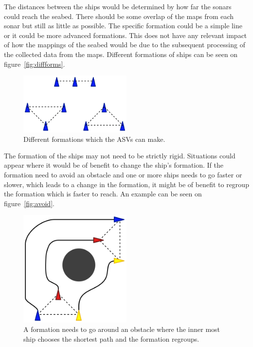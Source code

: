 The distances between the ships would be determined by how far the sonars could reach the seabed. There should be some overlap of the maps from each sonar but still as little as possible. The specific formation could be a simple line or it could be more advanced formations. This does not have any relevant impact of how the mappings of the seabed would be due to the subsequent processing of the collected data from the maps. Different formations of ships can be seen on figure~\vref{fig:diffforms}.
\begin{figure}[htbp]
	\centering
	\includegraphics[width=0.5\textwidth]{fig/diffforms}
	\caption{Different formations which the \ac{ASV}s can make.}
	\label{fig:diffforms}
\end{figure}
The formation of the ships may not need to be strictly rigid. Situations could appear where it would be of benefit to change the ship's formation. If the formation need to avoid an obstacle and one or more ships needs to go faster or slower, which leads to a change in the formation, it might be of benefit to regroup the formation which is faster to reach. An example can be seen on figure~\vref{fig:avoid}.
\begin{figure}[htbp]
	\centering
	\includegraphics[width=0.5\textwidth]{fig/form_avoid}
	\caption{A formation needs to go around an obstacle where the inner most ship chooses the shortest path and the formation regroups.}
	\label{fig:avoid}
\end{figure}

